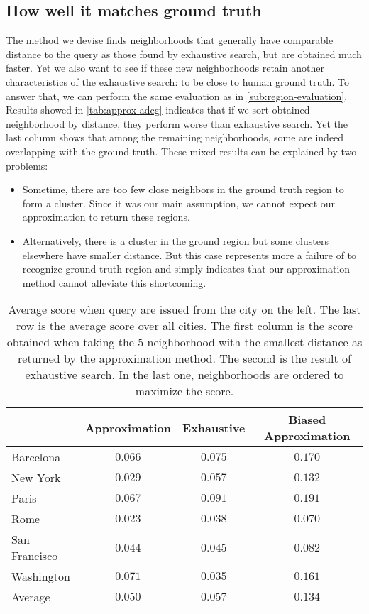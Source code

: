 \subsection{How well it matches ground truth}

The method we devise finds neighborhoods that generally have comparable
distance to the query as those found by exhaustive search, but are obtained
much faster.
Yet we also want to see if these new neighborhoods retain another
characteristics of the exhaustive search: to be close to human ground
truth. To answer that, we can perform the same evaluation as in
\autoref{sub:region-evaluation}. Results showed in \autoref{tab:approx-adcg}
indicates that if we sort obtained neighborhood by \emd{} distance, they
perform worse than exhaustive search. Yet the last column shows that among
the remaining neighborhoods, some are indeed overlapping with the ground truth.
These mixed results can be explained by two problems:
\begin{itemize}
	\item Sometime, there are too few close neighbors in the ground truth
		region to form a cluster. Since it was our main assumption, we cannot
		expect our approximation to return these regions.
	\item Alternatively, there is a cluster in the ground region but some
		clusters elsewhere have smaller \emd{} distance. But this case
		represents more a failure of \emd{} to recognize ground truth region and simply
		indicates that our approximation method cannot alleviate this
		shortcoming.
\end{itemize}

\begin{table}[t]
	\centering
	\begin{tabular}{lccc}
		\toprule
		              & Approximation & Exhaustive & Biased Approximation \\
		\midrule
		Barcelona     & $0.066$       & $0.075$       & $0.170$ \\
		New York      & $0.029$       & $0.057$       & $0.132$ \\
		Paris         & $0.067$       & $0.091$       & $0.191$ \\
		Rome          & $0.023$       & $0.038$       & $0.070$ \\
		San Francisco & $0.044$       & $0.045$       & $0.082$ \\
		Washington    & $0.071$       & $0.035$       & $0.161$ \\
		\midrule
		Average       & $0.050$       & $0.057$       & $0.134$ \\
		\bottomrule
	\end{tabular}
	\caption[Approximation ability to recover ground truth]{Average score when
		query are issued from the city on the left. The last row is the average
		score over all cities. The first column is the score obtained when
		taking the $5$ neighborhood with the smallest distance as returned by
		the approximation method. The second is the result of exhaustive
		search.  In the last one, neighborhoods are ordered to maximize the
		score. \label{tab:approx-adcg}}
\end{table}
